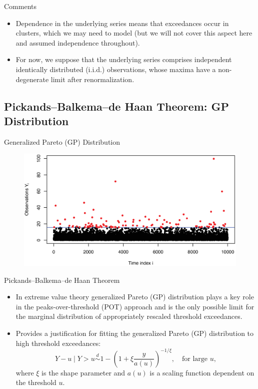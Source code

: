 \documentclass[10pt, hyperref={colorlinks = true,linkcolor = blue}]{beamer}
\begin{document}
{\begin{frame}{Comments}
\begin{itemize}
    \item Dependence in the underlying series means that exceedances occur in clusters, which we may need to model (but we will not cover this aspect here and assumed independence throughout).

    \item For now, we suppose that the underlying series comprises independent identically distributed (i.i.d.) observations, whose maxima have a non-degenerate limit after renormalization.
\end{itemize}
\end{frame}


{\subsection{Pickands–Balkema–de Haan Theorem: GP Distribution}

\begin{frame}{Generalized Pareto (GP) Distribution}
\begin{figure}
\includegraphics[scale=0.5]{figures/Plot2b.eps}
\end{figure}
\end{frame}


\begin{frame}{Pickands–Balkema–de Haan Theorem}
\begin{itemize}
 \item In extreme value theory {\color{violet} generalized Pareto (GP)} distribution plays a key role in the peaks-over-threshold (POT) approach  and is the only possible limit for the marginal distribution of appropriately rescaled threshold exceedances. 
    \item Provides a justification for fitting the generalized Pareto (GP) distribution to high threshold exceedances:
    \[
    Y - u \mid Y > u \overset{d}{\sim} 1 - \left(1 + \xi \frac{y}{a(u)}\right)^{-1/\xi}, \quad \text{for large } u,
    \]
    where \(\xi\) is the shape parameter and \(a(u)\) is a scaling function dependent on the threshold \(u\).
\end{itemize}
\end{frame}


}}
\end{document}
